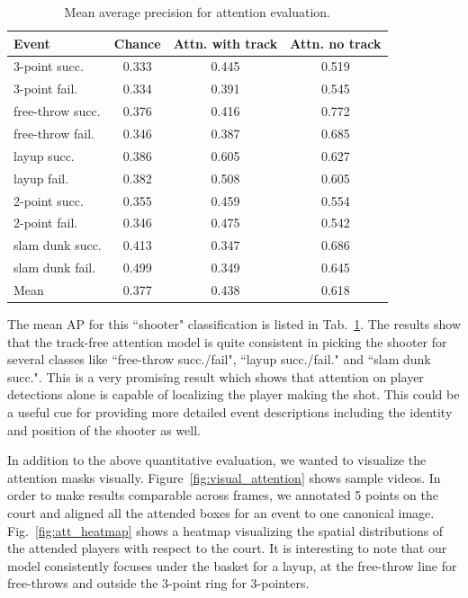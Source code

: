 \begin{table}[ht!]
\begin{center}
  \vspace{-4mm}
\small
 \begin{tabular}{|l|c|c|c|}
  \hline
Event            & Chance & Attn. with track & Attn. no track \\ \hline \hline
3-point succ.    & 0.333 & 0.445 & 0.519 \\ 
3-point fail.    & 0.334 & 0.391 & 0.545 \\ 
free-throw succ. & 0.376 & 0.416 & 0.772 \\ 
free-throw fail. & 0.346 & 0.387 & 0.685 \\  
layup succ.      & 0.386 & 0.605 & 0.627 \\ 
layup fail.      & 0.382 & 0.508 & 0.605 \\ 
2-point succ.    & 0.355 & 0.459 & 0.554 \\ 
2-point fail.    & 0.346 & 0.475 & 0.542 \\ 
slam dunk succ.  & 0.413 & 0.347 & 0.686 \\ 
slam dunk fail.  & 0.499 & 0.349 & 0.645 \\ \hline \hline  
Mean             & 0.377 & 0.438 & 0.618 \\ \hline
  \end{tabular}
\end{center}
  \caption{Mean average precision for attention evaluation.}
  \vspace{-4mm}
  \label{tab:attention_res}
\end{table}


The mean AP for this ``shooter"  classification is listed in
Tab.~\ref{tab:attention_res}.  The results show that the track-free attention
model is quite consistent in picking the shooter for several classes like
``free-throw succ./fail", ``layup succ./fail." and ``slam dunk succ.". This is
a very promising result which shows that attention on player detections alone
is capable of localizing the player making the shot. This could be a useful cue
for providing more detailed event descriptions including the identity and
position of the shooter as well.

In addition to the above quantitative evaluation, we wanted to visualize the
attention masks visually.  Figure~\ref{fig:visual_attention} shows 
sample videos.  In order to make results comparable across frames, we annotated
5 points on the court and aligned all the attended boxes for an event to one
canonical image.  Fig.~\ref{fig:att_heatmap} shows a heatmap  visualizing the
spatial distributions of the attended players with respect to the court. It is
interesting to note that our model consistently focuses under the basket for a
layup, at the free-throw line for free-throws and outside the 3-point ring for
3-pointers.

